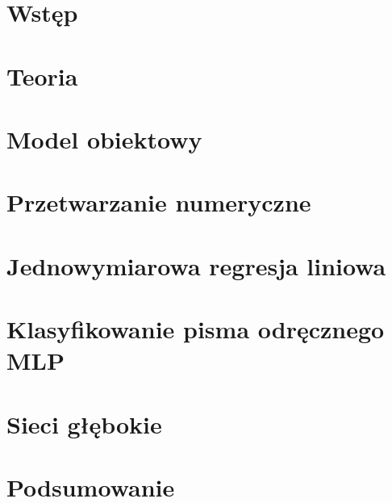\chapter{Wstęp}



\chapter{Teoria}



\chapter{Model obiektowy}

 
\chapter{Przetwarzanie numeryczne}


%

\chapter{Jednowymiarowa regresja liniowa}


\chapter{Klasyfikowanie pisma odręcznego MLP}


\chapter{Sieci głębokie}



\chapter{Podsumowanie}
\label{ch:podsumowanie}



